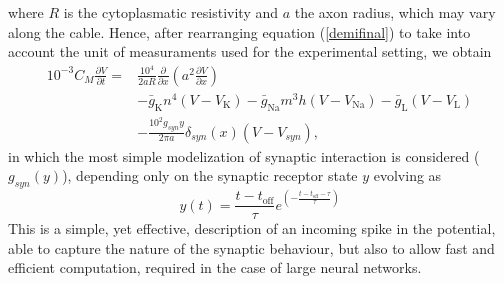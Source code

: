 \documentclass[a4paper,11pt ]{report}
\theoremstyle{definition}
\begin{document}
where $R$ is the cytoplasmatic resistivity and $a$ the axon radius, which may vary along the cable.
Hence, after rearranging equation (\ref{demifinal}) to take into account the unit of measuraments used for the experimental setting, we obtain
\begin{align}\label{final}
10^{-3}C_M\frac{\partial V}{\partial t}=&\frac{10^4}{2aR}\frac{\partial}{\partial x}\left(a^2\frac{\partial V}{\partial x}\right) \nonumber\\
&-\bar{g}_\text{K}n^4(V-V_\text{K})- \bar{g}_\text{Na}m^3h(V-V_\text{Na})-\bar{g}_\text{L}(V-V_\text{L})\\
&-\frac{10^2g_{syn}y}{2\pi a}\delta_{syn}(x)(V-V_{syn}) \nonumber,
\end{align}
in which the most simple modelization of synaptic interaction is considered ($g_{syn}(y)$), depending only on the synaptic receptor state $y$ evolving as
\begin{equation*}
y(t)=\frac{t-t_{\mathrm{off}}}{\tau}e^{\left(-\frac{t-t_{\mathrm{off}}-\tau}{\tau}\right)}
\end{equation*}
This is a simple, yet effective, description of an incoming spike in the potential, able to capture the nature of the synaptic behaviour, but also to allow fast and efficient computation, required in the case of large neural networks.
\end{document}
